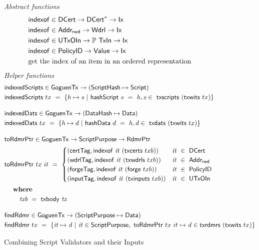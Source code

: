 \begin{figure}[htb]
  \emph{Abstract functions}
  \begin{align*}
    &\mathsf{indexof} \in \mathsf{DCert} \to \mathsf{DCert}^{*} \to \mathsf{Ix}\\
    &\mathsf{indexof} \in \mathsf{Addr_{rwd}} \to \mathsf{Wdrl} \to \mathsf{Ix}\\
    &\mathsf{indexof} \in \mathsf{UTxOIn} \to \mathbb{P}~\mathsf{TxIn} \to \mathsf{Ix}\\
    &\mathsf{indexof} \in \mathsf{PolicyID} \to \mathsf{Value} \to \mathsf{Ix}\\
    & \text{get the index of an item in an ordered representation}
  \end{align*}
  \emph{Helper functions}
  \begin{align*}
    &\fun{indexedScripts} \in \GoguenTx \to (\ScriptHash \mapsto \Script) \\
    &\fun{indexedScripts}~{tx} ~=~ \{ h \mapsto s ~\vert~ \fun{hashScript}~{s}~=~h,
     s\in~\fun{txscripts}~(\fun{txwits}~{tx})\}
    \nextdef
    &\fun{indexedDats} \in \GoguenTx \to (\DataHash \mapsto \Data)\\
    &\fun{indexedDats}~{tx} ~=~ \{ h \mapsto d ~\vert~ \fun{hashData}~{d}~=~h,
     d\in~\fun{txdats}~(\fun{txwits}~{tx})\}
    \nextdef
    &\fun{toRdmrPtr} \in \GoguenTx \to \ScriptPurpose \to \RdmrPtr \\
    &\fun{toRdmrPtr}~{tx}~{it} ~=~
      \begin{cases}
        (\mathsf{certTag},\fun{indexof}~\var{it}~(\fun{txcerts}~{txb}))   & \var{it}~\in~\DCert \\
        (\mathsf{wdrlTag},\fun{indexof}~\var{it}~(\fun{txwdrls}~{txb}))   & \var{it}~\in~\AddrRWD \\
        (\mathsf{forgeTag},\fun{indexof}~\var{it}~(\fun{forge}~{txb}))    & \var{it}~\in~\PolicyID \\
        (\mathsf{inputTag},\fun{indexof}~\var{it}~(\fun{txinputs}~{txb})) & \var{it}~\in~\UTxOIn
      \end{cases} \\
    & ~~\where \\
    & ~~~~~~~ \var{txb}~=~\txbody{tx}
    \nextdef
    &\fun{findRdmr} \in \GoguenTx \to (\ScriptPurpose \mapsto \Data)\\
    & \fun{findRdmr}~{tx} ~=~ \{ \var{it} \mapsto \var{d} ~|~
      \var{it} \in \ScriptPurpose,~ \fun{toRdmrPtr}~{tx}~{it} \mapsto \var{d} \in \fun{txrdmrs}~(\fun{txwits}~{tx}) \}
  \end{align*}
  \caption{Combining Script Validators and their Inputs}
  \label{fig:functions:script1}
\end{figure}


